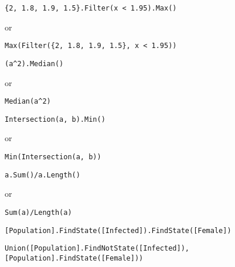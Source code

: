 \documentclass[]{memoir}
\begin{document}
\lstinline!{2, 1.8, 1.9, 1.5}.Filter(x < 1.95).Max()!

or

\lstinline!Max(Filter({2, 1.8, 1.9, 1.5}, x < 1.95))!


\lstinline!(a^2).Median()!

or

\lstinline!Median(a^2)!


\lstinline!Intersection(a, b).Min()!

or

\lstinline!Min(Intersection(a, b))!


\lstinline!a.Sum()/a.Length()!

or

\lstinline!Sum(a)/Length(a)!


\lstinline![Population].FindState([Infected]).FindState([Female])!


\lstinline!Union([Population].FindNotState([Infected]), [Population].FindState([Female]))!

\end{document}
